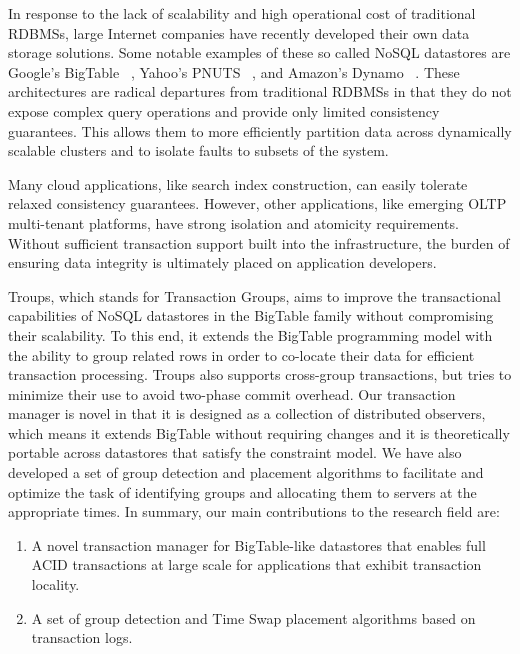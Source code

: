 \documentclass[10pt,final,journal]{IEEEtran}
\begin{document}
In response to the lack of scalability and high operational cost of traditional RDBMSs, large Internet companies have recently developed their own data storage solutions. Some notable examples of these so called NoSQL datastores are Google's BigTable ~\cite{Chang:2006:BDS:1267308.1267323}, Yahoo's PNUTS ~\cite{Cooper:2008:PYH:1454159.1454167}, and Amazon's Dynamo ~\cite{DeCandia:2007:DAH:1323293.1294281}. These architectures are radical departures from traditional RDBMSs in that they do not expose complex query operations and provide only limited consistency guarantees. This allows them to more efficiently partition data across dynamically scalable clusters and to isolate faults to subsets of the system.

Many cloud applications, like search index construction, can easily tolerate relaxed consistency guarantees. However, other applications, like emerging OLTP multi-tenant platforms, have strong isolation and atomicity requirements. Without sufficient transaction support built into the infrastructure, the burden of ensuring data integrity is ultimately placed on application developers.

Troups, which stands for Transaction Groups, aims to improve the transactional capabilities of NoSQL datastores in the BigTable family without compromising their scalability. To this end, it extends the BigTable programming model with the ability to group related rows in order to co-locate their data for efficient transaction processing. Troups also supports cross-group transactions, but tries to minimize their use to avoid two-phase commit overhead. Our transaction manager is novel in that it is designed as a collection of distributed observers, which means it extends BigTable without requiring changes and it is theoretically portable across datastores that satisfy the constraint model. We have also developed a set of group detection and placement algorithms to facilitate and optimize the task of identifying groups and allocating them to servers at the appropriate times. In summary, our main contributions to the research field are:

\begin{enumerate}
\item A novel transaction manager for BigTable-like datastores that enables full ACID transactions at large scale for applications that exhibit transaction locality.
\item A set of group detection and Time Swap placement algorithms based on transaction logs.
\end{enumerate}
\end{document}
